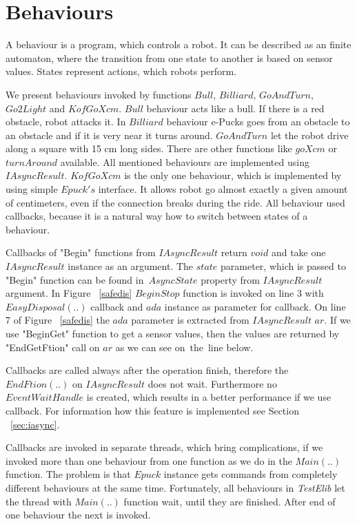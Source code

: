 \section{Behaviours} \label{sec:behaviours}
  A behaviour is a program, which controls a robot. It can be described as an finite automaton, 
  where the transition from one state to another is based on sensor values.
  States represent actions, which robots perform.
  
  We present behaviours invoked by functions $Bull$, $Billiard$, $GoAndTurn$, $Go2Light$ and $KofGoXcm$.
  $Bull$ behaviour acts like a bull. If there is a red obstacle, robot attacks it. 
  In $Billiard$ behaviour e-Pucks goes from an obstacle to an obstacle
  and if it is very near it turns around.
  $GoAndTurn$ let the robot drive along a square with 15 cm long sides. 
  There are other functions like $goXcm$ or $turnAround$ available.
  All mentioned behaviours are implemented using $IAsyncResult$. 
  $KofGoXcm$ is the only one behaviour, which is implemented by using simple $Epuck's$ interface.
  It allows robot go almost exactly a given amount of centimeters, even if the connection breaks during the ride.
  All behaviour used  callbacks, because it is a natural way how to switch between states of a behaviour.

  Callbacks of "Begin" functions from $IAsyncResult$ return $void$ 
  and take one $IAsyncResult$ instance as an argument.
  The $state$ parameter, which is passed to "Begin" function can be found 
  in~$AsyncState$ property from $IAsyncResult$ argument.
  In Figure ~\ref{safedis} $BeginStop$ function is invoked on line 
  3 with $EasyDisposal(..)$ callback 
  and $ada$ instance as parameter for callback.
  On line 7 of Figure ~\ref{safedis} the $ada$ parameter is extracted from $IAsyncResult$ $ar$.
  If we use "BeginGet" function to get a sensor values, 
  then the values are returned by "EndGetFtion" call on $ar$ as we can see on~the~line below.

  Callbacks are called always after the operation finish, therefore the $EndFtion(..)$ on $IAsyncResult$ does not wait.
  Furthermore no $EventWaitHandle$ is created, which results in a better performance if we use callback.
  For information how this feature is implemented see Section ~\ref{sec:iasync}.

  Callbacks are invoked in separate threads, which bring complications, if we invoked more than one behaviour
  from one function as we do in the $Main(..)$ function. 
  The problem is that $Epuck$ instance gets 
  commands from completely different behaviours at the same time.
  Fortunately, all behaviours in {\it TestElib} let the thread with $Main(..)$ function wait, until they are finished.
  After end of one behaviour the next is invoked.
  
